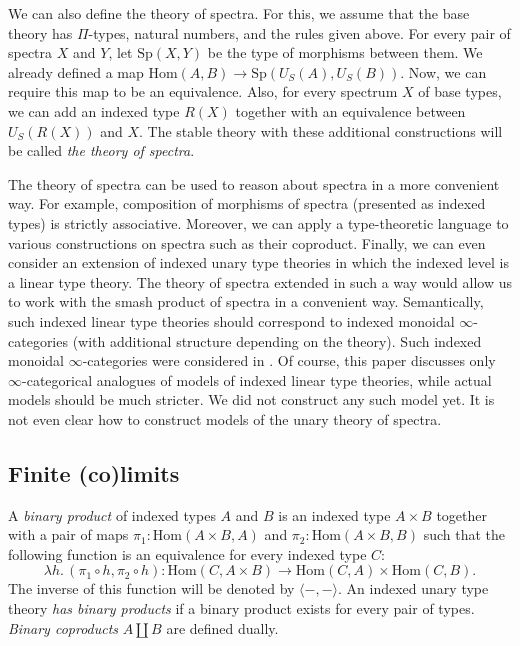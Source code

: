 \documentclass[reqno]{mscs}
\newcommand{\fs}[1]{\mathrm{#1}}
\newcommand{\Hom}{\fs{Hom}}
\numberwithin{figure}{section}
\begin{document}
We can also define the theory of spectra.
For this, we assume that the base theory has $\Pi$-types, natural numbers, and the rules given above.
For every pair of spectra $X$ and $Y$, let $\fs{Sp}(X,Y)$ be the type of morphisms between them.
We already defined a map $\Hom(A,B) \to \fs{Sp}(U_S(A),U_S(B))$.
Now, we can require this map to be an equivalence.
Also, for every spectrum $X$ of base types, we can add an indexed type $R(X)$ together with an equivalence between $U_S(R(X))$ and $X$.
The stable theory with these additional constructions will be called \emph{the theory of spectra}.

The theory of spectra can be used to reason about spectra in a more convenient way.
For example, composition of morphisms of spectra (presented as indexed types) is strictly associative.
Moreover, we can apply a type-theoretic language to various constructions on spectra such as their coproduct.
Finally, we can even consider an extension of indexed unary type theories in which the indexed level is a linear type theory.
The theory of spectra extended in such a way would allow us to work with the smash product of spectra in a convenient way.
Semantically, such indexed linear type theories should correspond to indexed monoidal $\infty$-categories (with additional structure depending on the theory).
Such indexed monoidal $\infty$-categories were considered in \cite[Definition~3.6]{schreiber-linear}.
Of course, this paper discusses only $\infty$-categorical analogues of models of indexed linear type theories, while actual models should be much stricter.
We did not construct any such model yet.
It is not even clear how to construct models of the unary theory of spectra.

\subsection{Finite (co)limits}

A \emph{binary product} of indexed types $A$ and $B$ is an indexed type $A \times B$ together with a pair of maps $\pi_1 : \Hom(A \times B, A)$ and $\pi_2 : \Hom(A \times B, B)$
such that the following function is an equivalence for every indexed type $C$:
\[ \lambda h.\,(\pi_1 \circ h, \pi_2 \circ h) : \Hom(C, A \times B) \to \Hom(C,A) \times \Hom(C,B). \]
The inverse of this function will be denoted by $\langle -, - \rangle$.
An indexed unary type theory \emph{has binary products} if a binary product exists for every pair of types.
\emph{Binary coproducts} $A \amalg B$ are defined dually.
\end{document}
